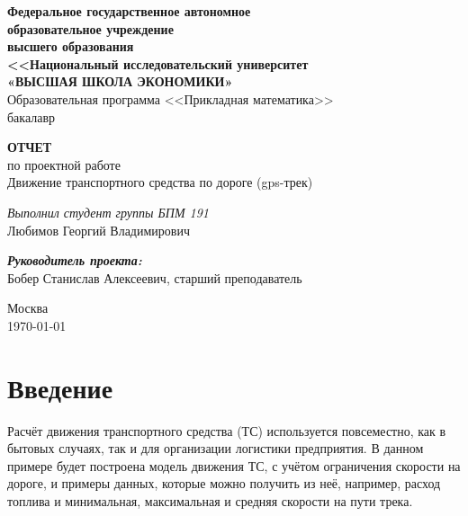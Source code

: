 \documentclass[A4paper,12pt]{article}
\theoremstyle{plain} %
\theoremstyle{definition} %
\theoremstyle{remark} %
\begin{document}
\thispagestyle{empty}
\begin{center}
\begin{spacing}{0.8}
\textbf{Федеральное государственное автономное\\
образовательное учреждение \\
высшего образования\\
<<Национальный исследовательский университет \\ «ВЫСШАЯ ШКОЛА ЭКОНОМИКИ»}\\
Образовательная программа <<Прикладная математика>>\\
бакалавр
\end{spacing}
\vspace{2 cm}

\textbf{ОТЧЕТ}\\
по проектной работе\\
Движение транспортного средства по дороге (gps-трек)

\end{center}
\vspace{13ex}
\begin{flushright}
\textit{Выполнил студент группы БПМ 191}\\
Любимов Георгий Владимирович
\end{flushright}
\begin{flushleft}
\textit{\textbf{Руководитель проекта:}}\\
Бобер Станислав Алексеевич, старший преподаватель
\end{flushleft}
\begin{center}
\vfill
\begin{spacing}{0.8}


\footnotesize{Москва \\
\today}
\end{spacing}
\end{center}

\newpage
\section*{Введение}

Расчёт движения транспортного средства (ТС) используется повсеместно, как в бытовых случаях, так и для организации логистики предприятия. В данном примере будет построена модель движения ТС, с учётом ограничения скорости на дороге, и примеры данных, которые можно получить из неё, например, расход топлива и минимальная, максимальная и средняя скорости на пути трека. 
\end{document}
